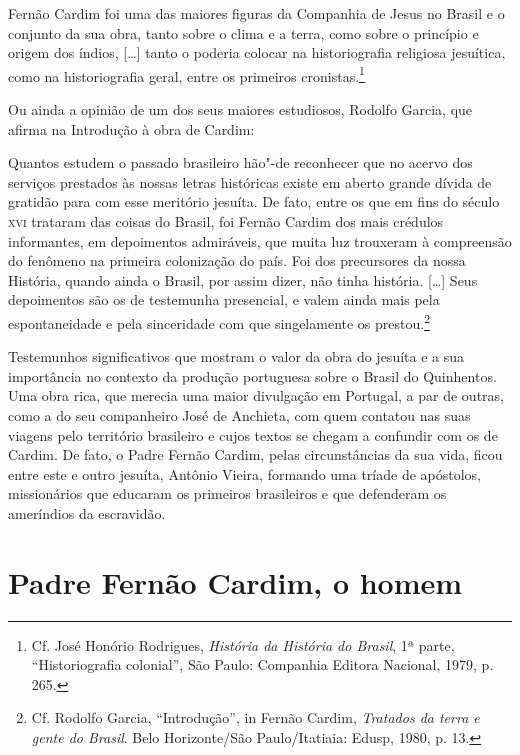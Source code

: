 \begin{hedraquote} 
Fernão Cardim foi uma das maiores figuras da
Companhia de Jesus no Brasil e o conjunto da sua obra, tanto sobre o
clima e a terra, como sobre o princípio e origem dos índios, [\ldots]
tanto o poderia colocar na historiografia religiosa jesuítica, como na
historiografia geral, entre os primeiros cronistas.\footnote{ Cf. 
José Honório Rodrigues, \textit{História da História do Brasil}, 
1ª parte, ``Historiografia colonial'', São Paulo: Companhia Editora
Nacional, 1979, p. 265.}
\end{hedraquote}

Ou ainda a opinião de um dos seus maiores estudiosos, Rodolfo
Garcia, que afirma na Introdução à obra de Cardim:

\begin{hedraquote} 
Quantos estudem o passado brasileiro hão"-de reconhecer que
no acervo dos serviços prestados às nossas letras históricas existe em
aberto grande dívida de gratidão para com esse meritório jesuíta. De
fato, entre os que em fins do século \textsc{xvi} trataram das coisas do
Brasil, foi Fernão Cardim dos mais crédulos informantes, em depoimentos
admiráveis, que muita luz trouxeram à compreensão do fenômeno na
primeira colonização do país. Foi dos precursores da nossa História,
quando ainda o Brasil, por assim dizer, não tinha história. [\ldots] Seus
depoimentos são os de testemunha presencial, e valem ainda mais pela
espontaneidade e pela sinceridade com que singelamente os prestou.\footnote{ Cf. 
Rodolfo Garcia, ``Introdução'', in Fernão Cardim, \textit{Tratados da terra e 
gente do Brasil}. Belo Horizonte/São Paulo/Itatiaia: Edusp, 1980, p. 13.} 
\end{hedraquote}

Testemunhos significativos que mostram o valor da obra do
jesuíta e a sua importância no contexto da produção portuguesa sobre o
Brasil do Quinhentos. Uma obra rica, que merecia uma maior divulgação em
Portugal, a par de outras, como a do seu companheiro José de Anchieta,
com quem contatou nas suas viagens pelo território brasileiro e cujos
textos se chegam a confundir com os de Cardim. De fato, o Padre Fernão
Cardim, pelas circunstâncias da sua vida, ficou entre este e outro
jesuíta, Antônio Vieira, formando uma tríade de apóstolos, missionários
que educaram os primeiros brasileiros e que defenderam os ameríndios da
escravidão. 

\section{Padre Fernão Cardim, o homem}

